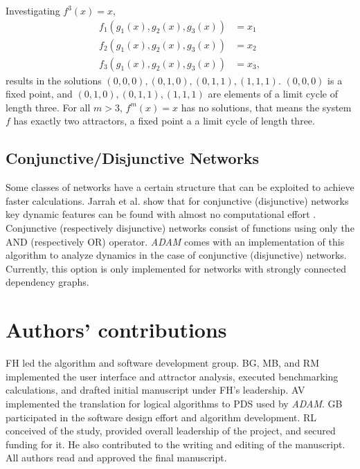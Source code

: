 \documentclass[10pt]{bmc_article}
\newenvironment{bmcformat}{\fussy\setboolean{publ}{true}}{\fussy}
\begin{document}
\begin{bmcformat}
\begin{example}
	Investigating $f^3(x) = x$,
	\begin{align*}
	f_1(g_1(x), g_2(x), g_3(x) ) &= x_1 \\
	f_2(g_1(x), g_2(x), g_3(x) ) &= x_2\\
	f_3(g_1(x), g_2(x), g_3(x) ) &= x_3, 
	\end{align*}
	results in the solutions $(0, 0, 0), (0, 1, 0), (0, 1, 1), (1, 1, 1)$. $(0,0,0)$ is a fixed point, and $(0, 1, 0), (0, 1, 1), (1, 1, 1)$ are elements of a limit cycle of length three. For all $m > 3$, $f^m(x)=x$ has no solutions, that means the system $f$ has exactly two attractors, a fixed point a a limit cycle of length three. 
\end{example}
\subsection{Conjunctive/Disjunctive Networks} \label{sec:conj}
Some classes of networks have a certain structure that can be
exploited to achieve faster calculations. Jarrah et al.
show that for conjunctive (disjunctive) networks key dynamic features can be found with
almost no computational effort \cite{conjunctive}. Conjunctive (respectively disjunctive) networks consist of
functions using only the AND (respectively OR) operator.
{\it ADAM} comes with an implementation of this algorithm to analyze
dynamics in the case of conjunctive (disjunctive) networks. Currently,
this option is only implemented for networks with strongly connected dependency graphs.


    

\section*{Authors' contributions}
FH led the algorithm and software development group. BG, MB, and RM implemented the user interface and attractor analysis, executed benchmarking calculations, and drafted initial manuscript under FH's leadership. AV implemented the translation for logical algorithms to PDS used by {\it ADAM}. GB participated in the software design effort and
algorithm development. RL  conceived of the study, provided overall leadership of the project, and secured
funding for it. He also contributed to the writing and editing of the manuscript. 
All authors read and approved the final manuscript.


\end{bmcformat}
\end{document}

